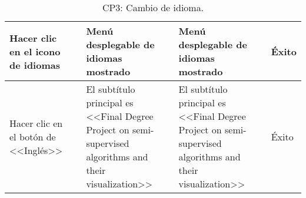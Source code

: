 \begin{table}[H]
\begin{tabular}{p{}p{}p{}p{}p{}}
Hacer clic en el icono de idiomas                      &                        & Menú desplegable de idiomas mostrado                                 & Menú desplegable de idiomas mostrado                                 & Éxito                            \\ \hline
Hacer clic en el botón de <<Inglés>>                   &                        & El subtítulo principal es <<Final Degree Project on semi-supervised algorithms and their visualization>>  & El subtítulo principal es <<Final Degree Project on semi-supervised algorithms and their visualization>>  & Éxito                            \\ \hline
\end{tabular}
\caption{CP3: Cambio de idioma.}
\end{table}

